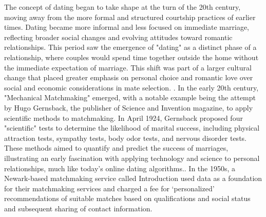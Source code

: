 The concept of dating began to take shape at the turn of the 20th century, moving away from the more formal and structured courtship practices of earlier times. Dating became more informal and less focused on immediate marriage, reflecting broader social changes and evolving attitudes toward romantic relationships. This period saw the emergence of "dating" as a distinct phase of a relationship, where couples would spend time together outside the home without the immediate expectation of marriage. This shift was part of a larger cultural change that placed greater emphasis on personal choice and romantic love over social and economic considerations in mate selection. \cite{markarian_how_2017}. In the early 20th century, "Mechanical Matchmaking" emerged, with a notable example being the attempt by Hugo Gernsback, the publisher of Science and Invention magazine, to apply scientific methods to matchmaking. In April 1924, Gernsback proposed four "scientific" tests to determine the likelihood of marital success, including physical attraction tests, sympathy tests, body odor tests, and nervous disorder tests. These methods aimed to quantify and predict the success of marriages, illustrating an early fascination with applying technology and science to personal relationships, much like today's online dating algorithms.\cite{magazine_mechanical_nodate}. In the 1950s, a Newark-based matchmaking service called Introduction used data as a foundation for their matchmaking services and charged a fee for ‘personalized’ recommendations of suitable matches based on qualifications and social status and subsequent sharing of contact information. \cite{newark_introduction_nodate}

